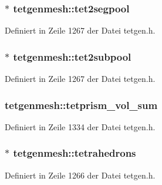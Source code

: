 \hypertarget{classtetgenmesh_a1a898456746189f3c656c22eaa6feb48}{
\subsubsection[{tet2segpool}]{ $\ast$ tetgenmesh\-::tet2segpool}}\label{classtetgenmesh_a1a898456746189f3c656c22eaa6feb48}


Definiert in Zeile 1267 der Datei tetgen.\-h.

\hypertarget{classtetgenmesh_a978aa6cc9c136c92ac09a6b56afc4eac}{
\subsubsection[{tet2subpool}]{$\ast$ tetgenmesh\-::tet2subpool}}\label{classtetgenmesh_a978aa6cc9c136c92ac09a6b56afc4eac}


Definiert in Zeile 1267 der Datei tetgen.\-h.

\hypertarget{classtetgenmesh_a95cbc379285aa695cd188cbfdea57f80}{
\subsubsection[{tetprism\-\_\-vol\-\_\-sum}]{ tetgenmesh\-::tetprism\-\_\-vol\-\_\-sum}}\label{classtetgenmesh_a95cbc379285aa695cd188cbfdea57f80}


Definiert in Zeile 1334 der Datei tetgen.\-h.

\hypertarget{classtetgenmesh_ae2ecb721778b73b3b10163e3069247a6}{
\subsubsection[{tetrahedrons}]{$\ast$ tetgenmesh\-::tetrahedrons}}\label{classtetgenmesh_ae2ecb721778b73b3b10163e3069247a6}


Definiert in Zeile 1266 der Datei tetgen.\-h.

